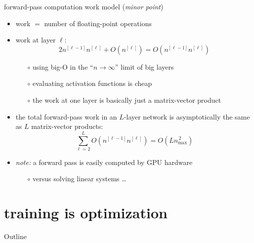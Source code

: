\documentclass[xcolor={svgnames},
               hyperref={colorlinks,citecolor=DeepPink4,linkcolor=FireBrick,urlcolor=Maroon}]
               {beamer}
\begin{document}
\begin{frame}{forward-pass computation work model (\emph{minor point})}

\begin{itemize}
\item \alert{work} $=$ number of floating-point operations
\item work at layer $\ell$:
    $$2 n^{[\ell-1]} n^{[\ell]} + O(n^{[\ell]}) = O(n^{[\ell-1]} n^{[\ell]})$$

    \begin{itemize}
    \item[$\circ$] using big-O in the ``$n \to \infty$'' limit of big layers
    \item[$\circ$] evaluating activation functions is cheap
    \item[$\circ$] the work at one layer is basically just a matrix-vector product
    \end{itemize}
\item the total forward-pass work in an $L$-layer network is asymptotically the same as $L$ matrix-vector products:
    $$\sum_{\ell=2}^L O(n^{[\ell-1]} n^{[\ell]}) = O(L n_{\text{max}}^{\,2})$$
\item \emph{note:} a forward pass is easily computed by GPU hardware
    \begin{itemize}
    \item[$\circ$] versus solving linear systems \dots
    \end{itemize}
\end{itemize}
\end{frame}


\section{training is optimization}

\begin{frame}{Outline}
\end{frame}
\end{document}

